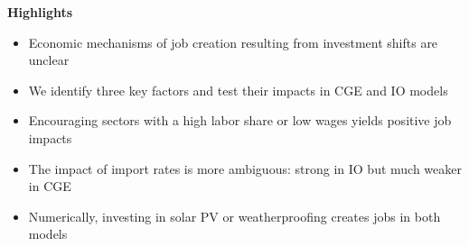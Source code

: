 \documentclass[1p]{elsarticle}
\begin{document}
\textbf{Highlights}
\begin{itemize}
	\itemsep-0.5em 
	\item Economic mechanisms of job creation resulting from investment shifts are unclear
	\item We identify three key factors and test their impacts in CGE and IO models
	\item Encouraging sectors with a high labor share or low wages yields positive job impacts
	\item The impact of import rates is more ambiguous: strong in IO but much weaker in CGE
	\item Numerically, investing in solar PV or weatherproofing creates jobs in both models
\end{itemize}

\cleardoublepage




\cleardoublepage

 


\begin{spacing}{01} 
	
	\begin{appendices}
		
	\end{appendices}
	
\end{spacing}
\end{document}
